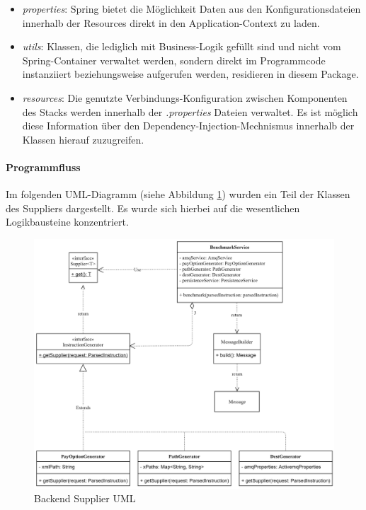 \begin{itemize}
  \item \emph{properties}: Spring bietet die Möglichkeit Daten aus den Konfigurationsdateien innerhalb der Resources direkt in den Application-Context zu laden.
  
  \item \emph{utils}: Klassen, die lediglich mit Business-Logik gefüllt sind und nicht vom Spring-Container verwaltet werden, sondern direkt im Programmcode instanziiert beziehungsweise aufgerufen werden, residieren in diesem Package.
  
  \item \emph{resources}: Die genutzte Verbindungs-Konfiguration zwischen Komponenten des Stacks werden innerhalb der \emph{.properties} Dateien verwaltet. Es ist möglich diese Information über den Dependency-Injection-Mechnismus innerhalb der Klassen hierauf zuzugreifen.

\end{itemize}


\paragraph{Programmfluss}
Im folgenden UML-Diagramm (siehe Abbildung \ref{fig:supplierUml}) wurden ein Teil der Klassen des Suppliers dargestellt. Es wurde sich hierbei auf die wesentlichen Logikbausteine konzentriert. 

\begin{figure}[ht!]
	\centering
	\includegraphics[width=\linewidth]{kapitel/problemloesung/implementierung/_img/supplier-uml}
	\caption[Backend Supplier UML]{Backend Supplier UML}
	\label{fig:supplierUml}
\end{figure}

